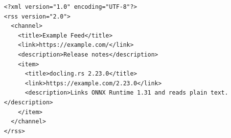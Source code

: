 \documentclass[11pt,a4paper]{article}
\begin{document}
\begin{verbatim}
<?xml version="1.0" encoding="UTF-8"?>
<rss version="2.0">
  <channel>
    <title>Example Feed</title>
    <link>https://example.com/</link>
    <description>Release notes</description>
    <item>
      <title>docling.rs 2.23.0</title>
      <link>https://example.com/2.23.0</link>
      <description>Links ONNX Runtime 1.31 and reads plain text.</description>
    </item>
  </channel>
</rss>
\end{verbatim}
\end{document}
